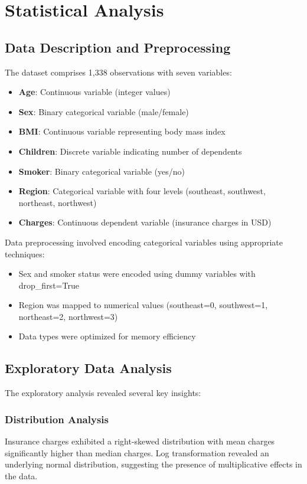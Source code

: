 \documentclass[12pt,a4paper]{article}
\begin{document}
\section{Statistical Analysis}

\subsection{Data Description and Preprocessing}

The dataset comprises 1,338 observations with seven variables:
\begin{itemize}
    \item \textbf{Age}: Continuous variable (integer values)
    \item \textbf{Sex}: Binary categorical variable (male/female)
    \item \textbf{BMI}: Continuous variable representing body mass index
    \item \textbf{Children}: Discrete variable indicating number of dependents
    \item \textbf{Smoker}: Binary categorical variable (yes/no)
    \item \textbf{Region}: Categorical variable with four levels (southeast, southwest, northeast, northwest)
    \item \textbf{Charges}: Continuous dependent variable (insurance charges in USD)
\end{itemize}

Data preprocessing involved encoding categorical variables using appropriate techniques:
\begin{itemize}
    \item Sex and smoker status were encoded using dummy variables with drop\_first=True
    \item Region was mapped to numerical values (southeast=0, southwest=1, northeast=2, northwest=3)
    \item Data types were optimized for memory efficiency
\end{itemize}

\subsection{Exploratory Data Analysis}

The exploratory analysis revealed several key insights:

\subsubsection{Distribution Analysis}
Insurance charges exhibited a right-skewed distribution with mean charges significantly higher than median charges. Log transformation revealed an underlying normal distribution, suggesting the presence of multiplicative effects in the data.
\end{document}
